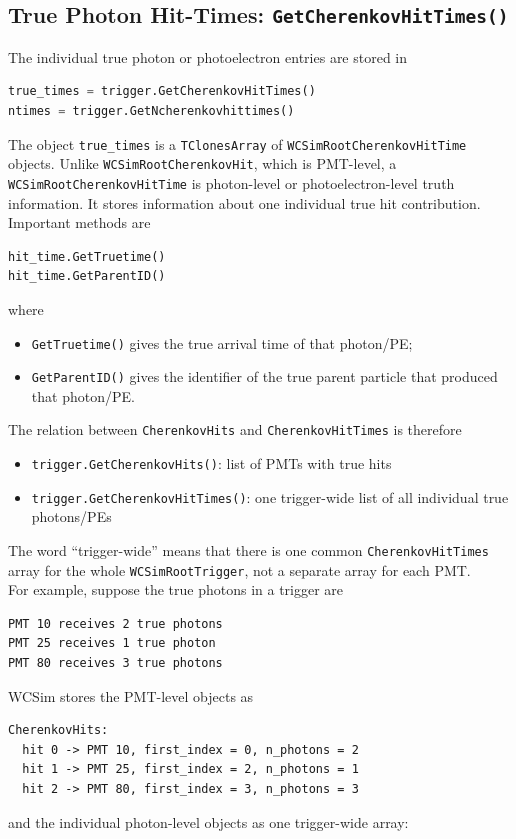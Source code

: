 \documentclass{article}
\numberwithin{table}{subsection}
\numberwithin{figure}{subsection}
\numberwithin{equation}{subsection}
\numberwithin{footnote}{subsection}
\begin{document}
\subsection{True Photon Hit-Times: \texttt{GetCherenkovHitTimes()}}

The individual true photon or photoelectron entries are stored in

\begin{lstlisting}[language=python]
true_times = trigger.GetCherenkovHitTimes()
ntimes = trigger.GetNcherenkovhittimes()
\end{lstlisting}
The object \texttt{true\_times} is a \texttt{TClonesArray} of
\texttt{WCSimRootCherenkovHitTime} objects.
Unlike \texttt{WCSimRootCherenkovHit}, which is PMT-level, a
\texttt{WCSimRootCherenkovHitTime} is photon-level or photoelectron-level truth
information. It stores information about one individual true hit contribution.\\
Important methods are
\begin{lstlisting}[language=python]
hit_time.GetTruetime()
hit_time.GetParentID()
\end{lstlisting}
where

\begin{itemize}
    \item \texttt{GetTruetime()} gives the true arrival time of that photon/PE;
    \item \texttt{GetParentID()} gives the identifier of the true parent particle
    that produced that photon/PE.
\end{itemize}
The relation between \texttt{CherenkovHits} and \texttt{CherenkovHitTimes} is
therefore
\begin{itemize}
\item \texttt{trigger.GetCherenkovHits()}: list of PMTs with true hits
\item \texttt{trigger.GetCherenkovHitTimes()}:
one trigger-wide list of all individual true photons/PEs
\end{itemize}
The word ``trigger-wide'' means that there is one common
\texttt{CherenkovHitTimes} array for the whole \texttt{WCSimRootTrigger}, not a
separate array for each PMT.\\
For example, suppose the true photons in a trigger are
\begin{lstlisting}
PMT 10 receives 2 true photons
PMT 25 receives 1 true photon
PMT 80 receives 3 true photons
\end{lstlisting}
WCSim stores the PMT-level objects as

\begin{lstlisting}
CherenkovHits:
  hit 0 -> PMT 10, first_index = 0, n_photons = 2
  hit 1 -> PMT 25, first_index = 2, n_photons = 1
  hit 2 -> PMT 80, first_index = 3, n_photons = 3
\end{lstlisting}
and the individual photon-level objects as one trigger-wide array:
\end{document}

